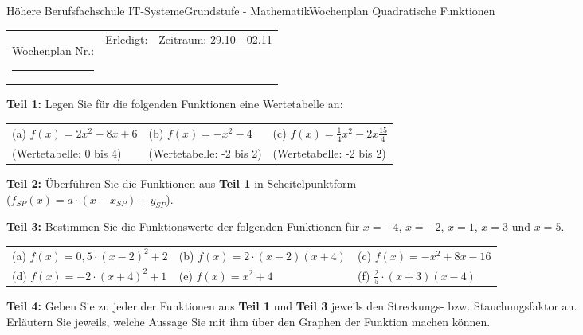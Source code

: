 \documentclass[oneside,openany,headings=optiontotoc,11pt,numbers=noenddot]{scrreprt}
\begin{document}
	\begin{worksheet}{Höhere Berufsfachschule IT-Systeme}{Grundstufe - Mathematik}{Wochenplan Quadratische Funktionen}
		\noindent
		\begin{tabularx}{\textwidth}{XXl}
			Wochenplan Nr.: \rule{0.15\textwidth}{1pt} & Erledigt: & Zeitraum: \underline{29.10 - 02.11}
		\end{tabularx}
	
		\begin{framed}
			\noindent
			\textbf{Teil 1:} Legen Sie für die folgenden Funktionen eine Wertetabelle an:\\
			\par\noindent
			\begin{tabularx}{\textwidth}{XXX}
				(a) \(f(x) = 2x^2 - 8x +6\) & (b) \(f(x) = -x^2  -4\) & (c) \(f(x) = \frac{1}{4}x^2 -2x \frac{15}{4}\)\\
				(Wertetabelle: 0 bis 4) & (Wertetabelle: -2 bis 2) & (Wertetabelle: -2 bis 2)
			\end{tabularx}
		\end{framed}
		\begin{framed}
			\noindent
			\textbf{Teil 2:} Überführen Sie die Funktionen aus \textbf{Teil 1} in Scheitelpunktform\\
			(\(f_{SP}(x) = a\cdot(x - x_{SP}) + y_{SP}\)).
		\end{framed}
		\begin{framed}
			\noindent
			\textbf{Teil 3:} Bestimmen Sie die Funktionswerte der folgenden Funktionen für \(x = -4\), \(x = -2\), \(x = 1\), \(x = 3\) und \(x = 5\).\\
			\par\noindent
			\begin{tabularx}{\textwidth}{XXX}
				(a) \(f(x) = 0,5\cdot(x-2)^2 + 2\) & (b) \(f(x) = 2\cdot(x-2)(x+4)\) & (c) \(f(x) = -x^2 + 8x -16\)\\
				(d) \(f(x) = -2\cdot(x+4)^2 + 1\) & (e) \(f(x) = x^2 + 4\) & (f) \(\frac{2}{5}\cdot(x+3)(x-4)\)
			\end{tabularx}
		\end{framed}
		\begin{framed}
			\noindent
			\textbf{Teil 4:} Geben Sie zu jeder der Funktionen aus \textbf{Teil 1} und \textbf{Teil 3} jeweils den Streckungs- bzw. Stauchungsfaktor an.\\
			Erläutern Sie jeweils, welche Aussage Sie mit ihm über den Graphen der Funktion machen können.
		\end{framed}
		\newpage
		\begin{framed}

\end{framed}
\end{worksheet}
\end{document}
